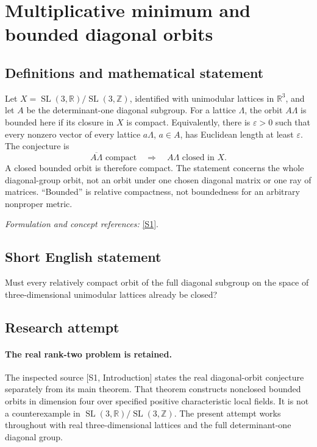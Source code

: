 \documentclass[11pt]{article}
\begin{document}
\section*{\texorpdfstring{Multiplicative minimum and bounded diagonal orbits}{Multiplicative minimum and bounded diagonal orbits}}\label{statement}
\subsection{Definitions and mathematical statement}
Let $X=\operatorname{SL}(3,{\mathbb{R}})/\operatorname{SL}(3,{\mathbb{Z}})$, identified with unimodular lattices in ${\mathbb{R}}^3$, and let $A$ be the determinant-one diagonal subgroup. For a lattice $\Lambda$, the orbit $A\Lambda$ is bounded here if its closure in $X$ is compact. Equivalently, there is ${\varepsilon}>0$ such that every nonzero vector of every lattice $a\Lambda$, $a\in A$, has Euclidean length at least ${\varepsilon}$. The conjecture is
\[
 \overline{A\Lambda}\text{ compact}\quad\Longrightarrow\quad
 A\Lambda\text{ closed in }X.
\]
A closed bounded orbit is therefore compact. The statement concerns the whole diagonal-group orbit, not an orbit under one chosen diagonal matrix or one ray of matrices. ``Bounded'' is relative compactness, not boundedness for an arbitrary nonproper metric.
\par\smallskip\textit{Formulation and concept references:} \href{https://arxiv.org/html/2504.17644v3}{[S1]}.

\subsection{Short English statement}
Must every relatively compact orbit of the full diagonal subgroup on the space of three-dimensional unimodular lattices already be closed?
\subsection{Research attempt}
\paragraph{The real rank-two problem is retained.}
The inspected source [S1, Introduction] states the real diagonal-orbit
conjecture separately from its main theorem. That theorem constructs
nonclosed bounded orbits in dimension four over specified positive
characteristic local fields. It is not a counterexample in
$\operatorname{SL}(3,\mathbb R)/\operatorname{SL}(3,\mathbb Z)$.
The present attempt works throughout with real three-dimensional
lattices and the full determinant-one diagonal group.
\end{document}
